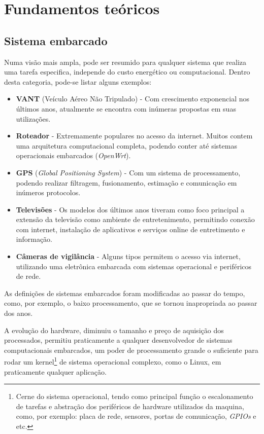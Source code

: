 \chapter{Fundamentos teóricos}

\section{Sistema embarcado}

Numa visão mais ampla, pode ser resumido para qualquer sistema que realiza uma tarefa especifica, independe do custo energético ou computacional. Dentro desta categoria, pode-se listar alguns exemplos:

\begin{itemize}
\item \textbf{VANT} (Veículo Aéreo Não Tripulado) - Com crescimento exponencial nos últimos anos, atualmente se encontra com inúmeras propostas em suas utilizações.
\item \textbf{Roteador} - Extremamente populares no acesso da internet. Muitos contem uma arquitetura computacional completa, podendo conter até sistemas operacionais embarcados (\textit{OpenWrt}\cite{openwrt}).
\item \textbf{GPS} (\textit{Global Positioning System}) - Com um sistema de processamento, podendo realizar filtragem, fusionamento, estimação e comunicação em inúmeros protocolos.
\item \textbf{Televisões} - Os modelos dos últimos anos tiveram como foco principal a extensão da televisão como ambiente de entretenimento, permitindo conexão com internet, instalação de aplicativos e serviços online de entretimento e informação.
\item \textbf{Câmeras de vigilância} - Alguns tipos permitem o acesso via internet, utilizando uma eletrônica embarcada com sistemas operacional e periféricos de rede.
\end{itemize}


As definições de sistemas embarcados foram modificadas ao passar do tempo, como, por exemplo, o baixo processamento, que se tornou inapropriada ao passar dos anos.

\iffalse
A evolução do hardware, diminuiu o tamanho e preço de aquisição dos processados, permitiu praticamente a qualquer desenvolvedor de
sistemas computacionais embarcados, um poder de processamento grande o suficiente para rodar um kernel\footnote{Cerne do sistema
operacional, tendo como principal função o escalonamento de tarefas e abstração dos periféricos de hardware utilizados da maquina,
como, por exemplo: placa de rede, sensores, portas de comunicação, \textit{GPIOs} e etc.} de sistema operacional complexo, como o Linux, em praticamente qualquer aplicação.

